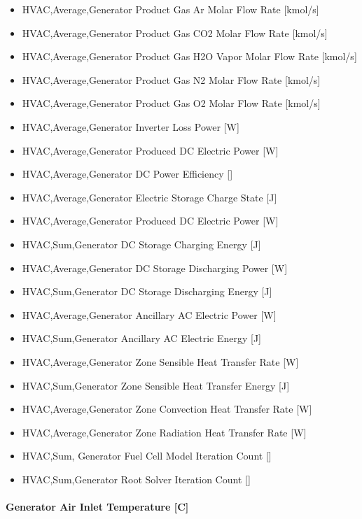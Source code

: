 \begin{itemize}
\item
  HVAC,Average,Generator Product Gas Ar Molar Flow Rate {[}kmol/s{]}
\item
  HVAC,Average,Generator Product Gas CO2 Molar Flow Rate {[}kmol/s{]}
\item
  HVAC,Average,Generator Product Gas H2O Vapor Molar Flow Rate {[}kmol/s{]}
\item
  HVAC,Average,Generator Product Gas N2 Molar Flow Rate {[}kmol/s{]}
\item
  HVAC,Average,Generator Product Gas O2 Molar Flow Rate {[}kmol/s{]}
\item
  HVAC,Average,Generator Inverter Loss Power {[}W{]}
\item
  HVAC,Average,Generator Produced DC Electric Power {[}W{]}
\item
  HVAC,Average,Generator DC Power Efficiency {[]}
\item
  HVAC,Average,Generator Electric Storage Charge State {[}J{]}
\item
  HVAC,Average,Generator Produced DC Electric Power {[}W{]}
\item
  HVAC,Sum,Generator DC Storage Charging Energy {[}J{]}
\item
  HVAC,Average,Generator DC Storage Discharging Power {[}W{]}
\item
  HVAC,Sum,Generator DC Storage Discharging Energy {[}J{]}
\item
  HVAC,Average,Generator Ancillary AC Electric Power {[}W{]}
\item
  HVAC,Sum,Generator Ancillary AC Electric Energy {[}J{]}
\item
  HVAC,Average,Generator Zone Sensible Heat Transfer Rate {[}W{]}
\item
  HVAC,Sum,Generator Zone Sensible Heat Transfer Energy {[}J{]}
\item
  HVAC,Average,Generator Zone Convection Heat Transfer Rate {[}W{]}
\item
  HVAC,Average,Generator Zone Radiation Heat Transfer Rate {[}W{]}
\item
  HVAC,Sum, Generator Fuel Cell Model Iteration Count {[]}
\item
  HVAC,Sum,Generator Root Solver Iteration Count {[]}
\end{itemize}

\paragraph{Generator Air Inlet Temperature {[}C{]}}\label{generator-air-inlet-temperature-c}

